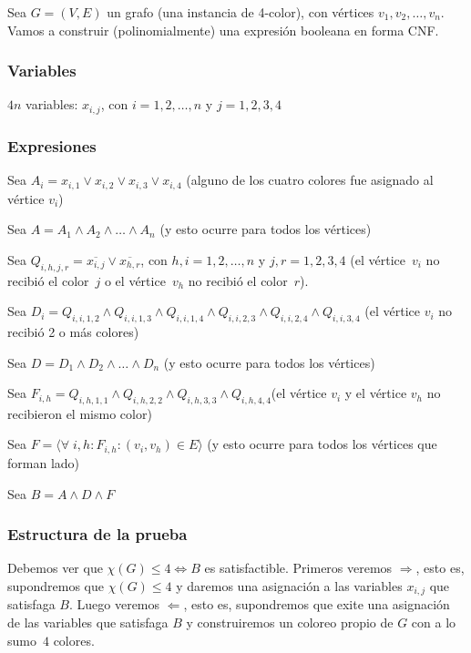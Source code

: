 \documentclass[10pt,a4paper]{article}
\begin{document}
Sea $G = (V, E)$ un grafo (una instancia de 4-color), con vértices $v_1, v_2, \dots, v_n$. Vamos a construir (polinomialmente) una expresión booleana en forma CNF.

\subsubsection*{Variables}

$4n$ variables: $x_{i,j}$, con $i = 1, 2, \dots, n $ y $j = 1, 2, 3, 4$

\subsubsection*{Expresiones}

Sea $A_i = x_{i,1} \lor x_{i,2} \lor x_{i,3} \lor x_{i,4}$ (alguno de los cuatro colores fue asignado al vértice $v_i$)

Sea $A = A_1 \land A_2 \land \dots \land A_n$ (y esto ocurre para todos los vértices)

Sea $Q_{i,h,j,r} = \overline{x_{i,j}} \lor \overline{x_{h,r}}$, con $h,i=1, 2, \dots, n$ y $j, r=1,2,3,4$ (el vértice $v_i$ no recibió el color $j$ o el vértice $v_h$ no recibió el color $r$).

Sea $D_i = Q_{i,i,1,2} \land Q_{i,i,1,3} \land Q_{i,i,1,4} \land Q_{i,i,2,3} \land Q_{i,i,2,4} \land Q_{i,i,3,4} $ (el vértice $v_i$ no recibió 2 o más colores)

Sea $D = D_1 \land D_2 \land \dots \land D_n$ (y esto ocurre para todos los vértices)

Sea $F_{i,h} = Q_{i,h,1,1} \land Q_{i,h,2,2} \land Q_{i,h,3,3} \land Q_{i,h,4,4} $(el vértice $v_i$ y el vértice $v_h$ no recibieron el mismo color)

Sea $F = \langle \forall \; i, h:F_{i,h}:(v_i,v_h) \in E\rangle$ (y esto ocurre para todos los vértices que forman lado)

Sea $B = A \land D \land F$

\subsubsection*{Estructura de la prueba}

Debemos ver que $\chi(G) \leq 4 \Leftrightarrow B$ es satisfactible. Primeros veremos $\Rightarrow$, esto es, supondremos que $\chi(G) \leq 4$ y daremos una asignación a las variables $x_{i,j}$ que satisfaga $B$. Luego veremos $\Leftarrow$, esto es, supondremos que exite una asignación de las variables que satisfaga $B$ y construiremos un coloreo propio de $G$ con a lo sumo $4$ colores.
\end{document}
